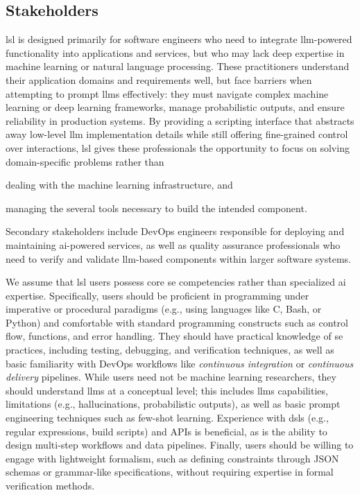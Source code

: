 \documentclass[manuscript,screen]{acmart}
\begin{document}
\subsection{Stakeholders}
\label{sec:stakeholders}

\ac{lsl} is designed primarily for software engineers who need to integrate \ac{llm}-powered functionality into applications and services, but who may lack deep expertise in machine learning or natural language processing.
These practitioners understand their application domains and requirements well, but face barriers when attempting to prompt \acp{llm} effectively: they must navigate complex machine learning or deep learning frameworks, manage probabilistic outputs, and ensure reliability in production systems.
By providing a scripting interface that abstracts away low-level \ac{llm} implementation details while still offering fine-grained control over interactions, \ac{lsl} gives these professionals the opportunity to focus on solving domain-specific problems rather than
\begin{enumerate*}[label=(\roman*)]
    \item dealing with the machine learning infrastructure, and
    \item managing the several tools necessary to build the intended component.
\end{enumerate*}
Secondary stakeholders include DevOps engineers responsible for deploying and maintaining \ac{ai}-powered services, as well as quality assurance professionals who need to verify and validate \ac{llm}-based components within larger software systems.

We assume that \ac{lsl} users possess core \ac{se} competencies rather than specialized \ac{ai} expertise.
Specifically, users should be proficient in programming under imperative or procedural paradigms (e.g., using languages like C, Bash, or Python) and comfortable with standard programming constructs such as control flow, functions, and error handling.
They should have practical knowledge of \ac{se} practices, including testing, debugging, and verification techniques, as well as basic familiarity with DevOps workflows like \emph{continuous integration} or \emph{continuous delivery} pipelines.
While users need not be machine learning researchers, they should understand \acp{llm} at a conceptual level; this includes \acp{llm} capabilities, limitations (e.g., hallucinations, probabilistic outputs), as well as basic prompt engineering techniques such as few-shot learning.
Experience with \acp{dsl} (e.g., regular expressions, build scripts) and APIs is beneficial, as is the ability to design multi-step workflows and data pipelines.
Finally, users should be willing to engage with lightweight formalism, such as defining constraints through JSON schemas or grammar-like specifications, without requiring expertise in formal verification methods.
\end{document}
